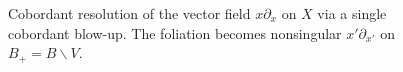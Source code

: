 \documentclass{amsart}
\renewcommand{\setminus}{\smallsetminus}
\begin{document}
\begin{figure}[ht]
\caption{Cobordant resolution of the vector field $x\partial_x$ on $X$ via a single cobordant  blow-up. The foliation becomes nonsingular $x'\partial_{x'}$ on $B_+ = B \setminus V$.}
\label{F5}
\end{figure}
\end{document}
